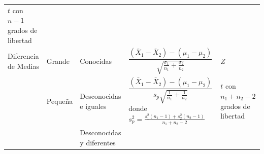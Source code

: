 \documentclass[]{book}
\begin{document}
\begin{longtable}[]{@{}lllll@{}}
\begin{minipage}[t]{0.05\columnwidth}
\(t\) con \(n-1\) grados de libertad\strut
\end{minipage}\tabularnewline
\begin{minipage}[t]{0.05\columnwidth}\raggedright\strut
Diferencia de Medias\strut
\end{minipage} & \begin{minipage}[t]{0.05\columnwidth}\raggedright\strut
Grande\strut
\end{minipage} & \begin{minipage}[t]{0.05\columnwidth}\raggedright\strut
Conocidas\strut
\end{minipage} & \begin{minipage}[t]{0.05\columnwidth}\raggedright\strut
\(\dfrac{\left( \bar{X}_1-\bar{X}_2 \right)- \left(\mu_1 - \mu_2 \right)}{\sqrt{\frac{\sigma_1}{n_1}+ \frac{\sigma_2}{n_2} }}\)\strut
\end{minipage} & \begin{minipage}[t]{0.05\columnwidth}\raggedright\strut
\(Z\)\strut
\end{minipage}\tabularnewline
\begin{minipage}[t]{0.05\columnwidth}\raggedright\strut
\strut
\end{minipage} & \begin{minipage}[t]{0.05\columnwidth}\raggedright\strut
Pequeña\strut
\end{minipage} & \begin{minipage}[t]{0.05\columnwidth}\raggedright\strut
Desconocidas e iguales\strut
\end{minipage} & \begin{minipage}[t]{0.05\columnwidth}\raggedright\strut
\(\dfrac{\left( \bar{X}_1-\bar{X}_2 \right)- \left(\mu_1 - \mu_2 \right)}{s_p\sqrt{\frac{1}{n_1}+ \frac{1}{n_2} }}\)
donde
\(s^2_p=\frac{s^2_1\left(n_1-1\right)+s^2_2\left(n_2-1\right)}{n_1+n_2-2}\)\strut
\end{minipage} & \begin{minipage}[t]{0.05\columnwidth}\raggedright\strut
\(t\) con \(n_1+n_2-2\) grados de libertad\strut
\end{minipage}\tabularnewline
\begin{minipage}[t]{0.05\columnwidth}\raggedright\strut
\strut
\end{minipage} & \begin{minipage}[t]{0.05\columnwidth}\raggedright\strut
\strut
\end{minipage} & \begin{minipage}[t]{0.05\columnwidth}\raggedright\strut
Desconocidas y diferentes\strut

\end{minipage}
\end{longtable}
\end{document}
